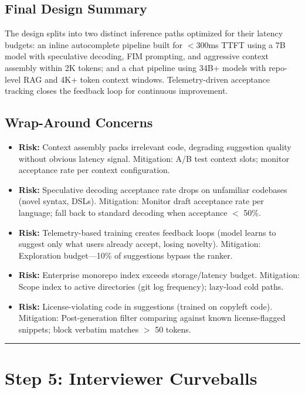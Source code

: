 \subsection*{Final Design Summary}

The design splits into two distinct inference paths optimized for their latency budgets: an inline autocomplete pipeline built for $<$300ms TTFT using a 7B model with speculative decoding, FIM prompting, and aggressive context assembly within 2K tokens; and a chat pipeline using 34B+ models with repo-level RAG and 4K+ token context windows. Telemetry-driven acceptance tracking closes the feedback loop for continuous improvement.

\subsection*{Wrap-Around Concerns}

\begin{itemize}
  \item \textbf{Risk:} Context assembly packs irrelevant code, degrading suggestion quality without obvious latency signal. Mitigation: A/B test context slots; monitor acceptance rate per context configuration.
  \item \textbf{Risk:} Speculative decoding acceptance rate drops on unfamiliar codebases (novel syntax, DSLs). Mitigation: Monitor draft acceptance rate per language; fall back to standard decoding when acceptance $<$ 50\%.
  \item \textbf{Risk:} Telemetry-based training creates feedback loops (model learns to suggest only what users already accept, losing novelty). Mitigation: Exploration budget---10\% of suggestions bypass the ranker.
  \item \textbf{Risk:} Enterprise monorepo index exceeds storage/latency budget. Mitigation: Scope index to active directories (git log frequency); lazy-load cold paths.
  \item \textbf{Risk:} License-violating code in suggestions (trained on copyleft code). Mitigation: Post-generation filter comparing against known license-flagged snippets; block verbatim matches $>$ 50 tokens.
\end{itemize}

\bigskip\hrule\bigskip

\section*{Step 5: Interviewer Curveballs}

